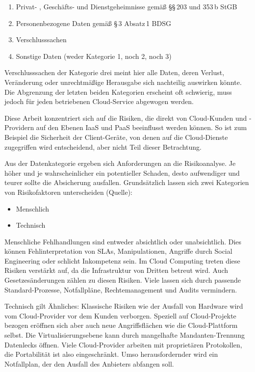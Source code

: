 \begin{enumerate}
	\item Privat- , Geschäfts- und Dienstgeheimnisse gemäß §§\,203 und 353\,b StGB
	\item Personenbezogene Daten gemäß §\,3 Absatz\,1 BDSG
	\item Verschlusssachen
	\item Sonstige Daten (weder Kategorie 1, noch 2, noch 3)	
\end{enumerate}

\noindent
Verschlusssachen der Kategorie drei meint hier alle Daten, deren Verlust, Veränderung oder unrechtmäßige Herausgabe sich nachteilig auswirken könnte. Die Abgrenzung der letzten beiden Kategorien erscheint oft schwierig, muss jedoch für jeden betriebenen Cloud-Service abgewogen werden.

Diese Arbeit konzentriert sich auf die Risiken, die direkt von Cloud-Kunden und -Providern auf den Ebenen IaaS und PaaS beeinflusst werden können. So ist zum Beispiel die Sicherheit der Client-Geräte, von denen auf die Cloud-Dienste zugegriffen wird entscheidend, aber nicht Teil dieser Betrachtung.

Aus der Datenkategorie ergeben sich Anforderungen an die Risikoanalyse. Je höher und je wahrscheinlicher ein potentieller Schaden, desto aufwendiger und teurer sollte die Absicherung ausfallen. Grundsätzlich lassen sich zwei Kategorien von Risikofaktoren unterscheiden (Quelle):
\begin{itemize}
	\item Menschlich
	\item Technisch
\end{itemize}

\noindent Menschliche Fehlhandlungen sind entweder absichtlich oder unabsichtlich. Dies können Fehlinterpretation von SLAs, Manipulationen, Angriffe durch Social Engineering oder schlicht Inkompetenz sein. Im Cloud Computing treten diese Risiken verstärkt auf, da die Infrastruktur von Dritten betreut wird. Auch Gesetzesänderungen zählen zu diesen Risiken. Viele lassen sich durch passende Standard-Prozesse, Notfallpläne, Rechtemanagement und Audits vermindern.

Technisch gilt Ähnliches: Klassische Risiken wie der Ausfall von Hardware wird vom Cloud-Provider vor dem Kunden verborgen. Speziell auf Cloud-Projekte bezogen eröffnen sich aber auch neue Angriffsflächen wie die Cloud-Plattform selbst. Die Virtualisierungsebene kann durch mangelhafte Mandanten-Trennung Datenlecks öffnen. Viele Cloud-Provider arbeiten mit proprietären Protokollen, die Portabilität ist also eingeschränkt. Umso herausfordernder wird ein Notfallplan, der den Ausfall des Anbieters abfangen soll.

